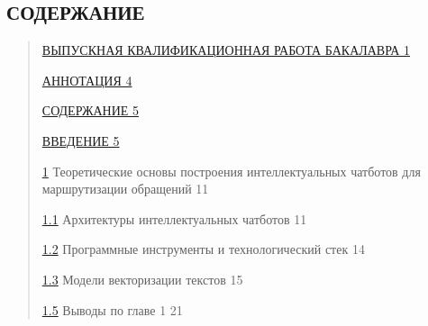 \documentclass[
]{article}
\begin{document}
\hypertarget{ux441ux43eux434ux435ux440ux436ux430ux43dux438ux435}{%
\subsection*{СОДЕРЖАНИЕ}\label{ux441ux43eux434ux435ux440ux436ux430ux43dux438ux435}}

\begin{quote}
\protect\hyperlink{ux432ux44bux43fux443ux441ux43aux43dux430ux44f-ux43aux432ux430ux43bux438ux444ux438ux43aux430ux446ux438ux43eux43dux43dux430ux44f-ux440ux430ux431ux43eux442ux430-ux431ux430ux43aux430ux43bux430ux432ux440ux430}{ВЫПУСКНАЯ
КВАЛИФИКАЦИОННАЯ РАБОТА БАКАЛАВРА 1}

\protect\hyperlink{ux430ux43dux43dux43eux442ux430ux446ux438ux44f}{АННОТАЦИЯ
4}

\protect\hyperlink{ux441ux43eux434ux435ux440ux436ux430ux43dux438ux435}{СОДЕРЖАНИЕ
5}

\protect\hyperlink{ux432ux432ux435ux434ux435ux43dux438ux435}{ВВЕДЕНИЕ 5}

\protect\hyperlink{ux442ux435ux43eux440ux435ux442ux438ux447ux435ux441ux43aux438ux435-ux43eux441ux43dux43eux432ux44b-ux43fux43eux441ux442ux440ux43eux435ux43dux438ux44f-ux438ux43dux442ux435ux43bux43bux435ux43aux442ux443ux430ux43bux44cux43dux44bux445-ux447ux430ux442ux431ux43eux442ux43eux432-ux434ux43bux44f-ux43cux430ux440ux448ux440ux443ux442ux438ux437ux430ux446ux438ux438-ux43eux431ux440ux430ux449ux435ux43dux438ux439}{1}
Теоретические основы построения интеллектуальных чатботов для
маршрутизации обращений 11

\protect\hyperlink{ux430ux440ux445ux438ux442ux435ux43aux442ux443ux440ux44b-ux438ux43dux442ux435ux43bux43bux435ux43aux442ux443ux430ux43bux44cux43dux44bux445-ux447ux430ux442ux431ux43eux442ux43eux432}{1.1}
Архитектуры интеллектуальных чатботов 11

\protect\hyperlink{ux43fux440ux43eux433ux440ux430ux43cux43cux43dux44bux435-ux438ux43dux441ux442ux440ux443ux43cux435ux43dux442ux44b-ux438-ux442ux435ux445ux43dux43eux43bux43eux433ux438ux447ux435ux441ux43aux438ux439-ux441ux442ux435ux43a}{1.2}
Программные инструменты и технологический стек 14

\protect\hyperlink{ux43cux43eux434ux435ux43bux438-ux432ux435ux43aux442ux43eux440ux438ux437ux430ux446ux438ux438-ux442ux435ux43aux441ux442ux43eux432}{1.3}
Модели векторизации текстов 15

\protect\hyperlink{ux432ux44bux432ux43eux434ux44b-ux43fux43e-ux433ux43bux430ux432ux435-1}{1.5}
Выводы по главе 1 21


\end{quote}
\end{document}
